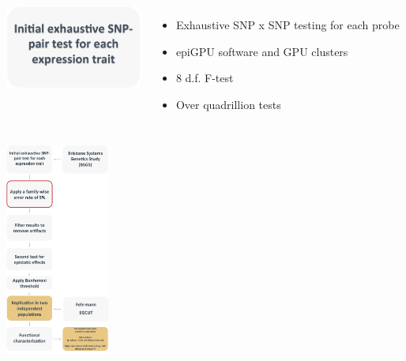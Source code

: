 \documentclass{beamer}
\begin{document}
\begin{frame}
\begin{columns}[c]
\includegraphics[width=4.5cm]{images/exhaustive.png} \\
\begin{itemize}
\item Exhaustive SNP x SNP testing for each probe
\vspace{0.3cm}
\item epiGPU software and GPU clusters
\vspace{0.3cm}
\item 8 d.f. F-test 
\vspace{0.3cm}
\item Over quadrillion tests  
\end{itemize}
\end{columns}
\end{frame}

\begin{frame}
\begin{center}
\includegraphics[height=7cm]{images/methods4.png} \\
\end{center}
\end{frame}
\end{document}

